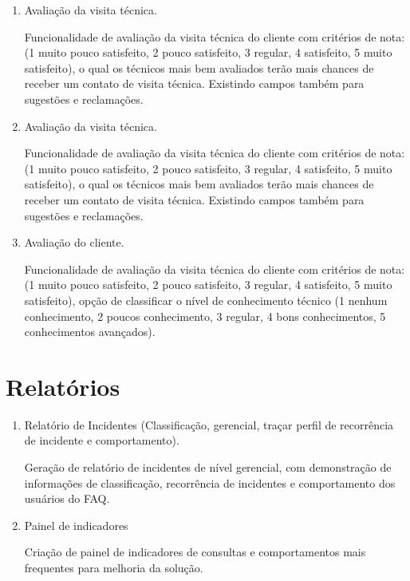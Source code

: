 \documentclass[
    12pt,               %
    openright,          %
    oneside,
    a4paper,            %
    MODELO,             %
    english,            %
    brazil              %
   ]{ifsp-spo-inf-ctds}
\begin{document}
	\begin{enumerate}
		
		\item Avaliação da visita técnica.
		
		Funcionalidade de avaliação da visita técnica do cliente com critérios de nota:(1 muito pouco satisfeito, 2 pouco satisfeito, 3 regular, 4 satisfeito, 5 muito satisfeito), o qual os técnicos mais bem avaliados terão mais chances de receber um contato de visita técnica. Existindo campos também para sugestões e reclamações.
	
	
		\item Avaliação da visita técnica.
		
		Funcionalidade de avaliação da visita técnica do cliente com critérios de nota:(1 muito pouco satisfeito, 2 pouco satisfeito, 3 regular, 4 satisfeito, 5 muito satisfeito), o qual os técnicos mais bem avaliados terão mais chances de receber um contato de visita técnica. Existindo campos também para sugestões e reclamações.
	
		\item Avaliação do cliente.
		
		Funcionalidade de avaliação da visita técnica do cliente com critérios de nota:(1 muito pouco satisfeito, 2 pouco satisfeito, 3 regular, 4 satisfeito, 5 muito satisfeito), opção de classificar o nível de conhecimento técnico (1 nenhum conhecimento, 2 poucos conhecimento, 3 regular, 4 bons conhecimentos, 5 conhecimentos avançados).
	
	\end{enumerate}

\section{Relatórios}

	\begin{enumerate}

		\item 
		Relatório de Incidentes (Classificação, gerencial, traçar perfil de recorrência de incidente e comportamento).
		
		Geração de relatório de incidentes de nível gerencial, com demonstração de informações de classificação, recorrência de incidentes e comportamento dos usuários do FAQ.
	
		\item 
		Painel de indicadores
		
		Criação de painel de indicadores de consultas e comportamentos mais frequentes para melhoria da solução.

	\end{enumerate}
	
\end{document}
